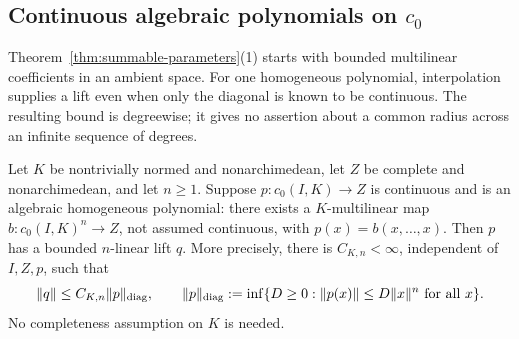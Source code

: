 \subsection{Continuous algebraic polynomials on \texorpdfstring{$c_0$}{c0}}
Theorem~\ref{thm:summable-parameters}(1) starts with bounded multilinear coefficients in an ambient space. For one
homogeneous polynomial, interpolation supplies a lift even when only the diagonal is known to be
continuous. The resulting bound is degreewise; it gives no assertion about a common radius across
an infinite sequence of degrees.

\begin{proposition}\label{fam:prop:c0-algebraic}
Let $K$ be nontrivially normed and nonarchimedean, let $Z$ be complete and nonarchimedean, and let
$n\ge1$. Suppose $p\colon c_0(I,K)\to Z$ is continuous and is an algebraic homogeneous polynomial:
there exists a $K$\nobreakdash-multilinear map $b\colon c_0(I,K)^n\to Z$, not assumed continuous,
with $p(x)=b(x,\ldots,x)$. Then $p$ has a bounded $n$\nobreakdash-linear lift $q$. More precisely,
there is $C_{K,n}<\infty$, independent of $I,Z,p$, such that
\[
 \lVert q\rVert\le C_{K,n}\lVert p\rVert_{\mathrm{diag}},\qquad
 \lVert p\rVert_{\mathrm{diag}}:=\inf\{D\ge0:\lVert p(x)\rVert\le D\lVert x\rVert^n\text{ for all }x\}.
\]
No completeness assumption on $K$ is needed.
\end{proposition}
